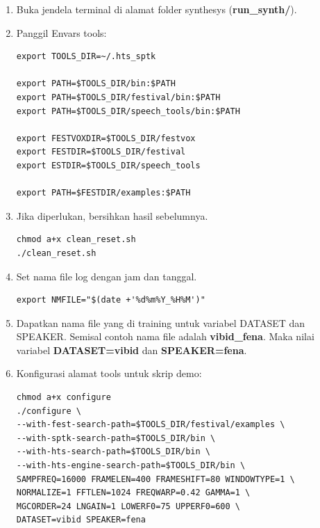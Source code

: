 \documentclass[12pt,]{article}
\begin{document}
	\begin{enumerate}
		\item Buka jendela terminal di alamat folder synthesys (\textbf{run\_synth/}).

		\item Panggil Envars tools:
		\begin{verbatim}
export TOOLS_DIR=~/.hts_sptk

export PATH=$TOOLS_DIR/bin:$PATH
export PATH=$TOOLS_DIR/festival/bin:$PATH
export PATH=$TOOLS_DIR/speech_tools/bin:$PATH

export FESTVOXDIR=$TOOLS_DIR/festvox
export FESTDIR=$TOOLS_DIR/festival
export ESTDIR=$TOOLS_DIR/speech_tools

export PATH=$FESTDIR/examples:$PATH
		\end{verbatim}

		\item Jika diperlukan, bersihkan hasil sebelumnya.
		\begin{verbatim}
chmod a+x clean_reset.sh
./clean_reset.sh
		\end{verbatim}

		\item Set nama file log dengan jam dan tanggal.
		\begin{verbatim}
export NMFILE="$(date +'%d%m%Y_%H%M')"
		\end{verbatim}

		\item Dapatkan nama file yang di training untuk variabel DATASET dan SPEAKER.
		Semisal contoh nama file adalah \textbf{vibid\_fena}.
		Maka nilai variabel \textbf{DATASET=vibid} dan \textbf{SPEAKER=fena}.

		\item Konfigurasi alamat tools untuk skrip demo:
		\begin{verbatim}
chmod a+x configure
./configure \
--with-fest-search-path=$TOOLS_DIR/festival/examples \
--with-sptk-search-path=$TOOLS_DIR/bin \
--with-hts-search-path=$TOOLS_DIR/bin \
--with-hts-engine-search-path=$TOOLS_DIR/bin \
SAMPFREQ=16000 FRAMELEN=400 FRAMESHIFT=80 WINDOWTYPE=1 \
NORMALIZE=1 FFTLEN=1024 FREQWARP=0.42 GAMMA=1 \
MGCORDER=24 LNGAIN=1 LOWERF0=75 UPPERF0=600 \
DATASET=vibid SPEAKER=fena
		\end{verbatim}


\end{enumerate}
\end{document}
